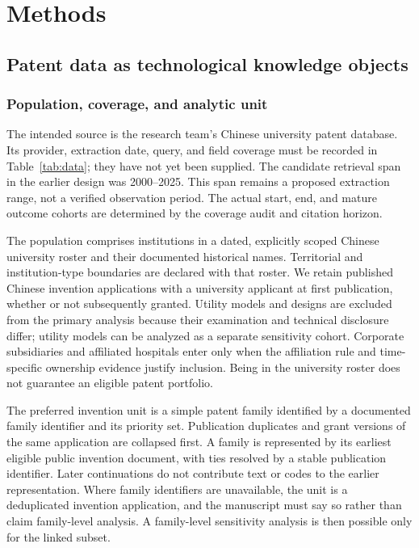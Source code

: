 \section{Methods}\label{sec:methods}
\subsection{Patent data as technological knowledge objects}\label{sec:data}
\subsubsection{Population, coverage, and analytic unit}
The intended source is the research team's Chinese university patent database.
Its provider, extraction date, query, and field coverage must be recorded in
Table~\ref{tab:data}; they have not yet been supplied. The candidate retrieval span
in the earlier design was 2000--2025. This span remains a proposed extraction range,
not a verified observation period. The actual start, end, and mature outcome
cohorts are determined by the coverage audit and citation horizon.

The population comprises institutions in a dated, explicitly scoped Chinese
university roster and their documented historical names. Territorial and
institution-type boundaries are declared with that roster. We retain published
Chinese invention applications with a university applicant at first publication,
whether or not subsequently granted. Utility models and designs are excluded from
the primary analysis because their examination and technical disclosure differ;
utility models can be analyzed as a separate sensitivity cohort. Corporate
subsidiaries and affiliated hospitals enter only when the affiliation rule and
time-specific ownership evidence justify inclusion. Being in the university
roster does not guarantee an eligible patent portfolio.

The preferred invention unit is a simple patent family identified by a documented
family identifier and its priority set. Publication duplicates and grant versions
of the same application are collapsed first. A family is represented by its
earliest eligible public invention document, with ties resolved by a stable
publication identifier. Later continuations do not contribute text or codes to
the earlier representation. Where family identifiers are unavailable, the unit
is a deduplicated invention application, and the manuscript must say so rather
than claim family-level analysis. A family-level sensitivity analysis is then
possible only for the linked subset.

